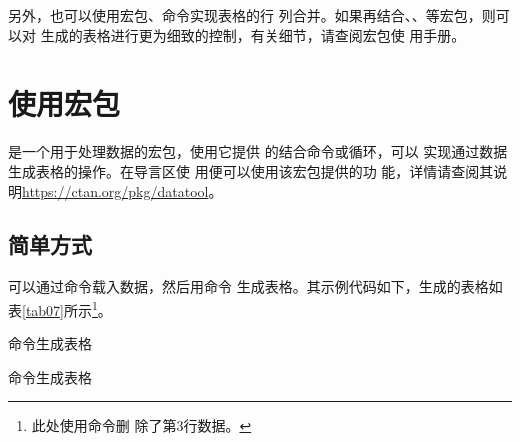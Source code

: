 \documentclass[scheme=chinese, heading = true, UTF8]{ctexart}
\begin{document}
  另外，也可以使用宏包、命令实现表格的行
  列合并。如果再结合、、等宏包，则可以对
  生成的表格进行更为细致的控制，有关细节，请查阅宏包使
  用手册。
        
  \section{使用宏包}
  是一个用于处理\csv 数据的宏包，使用它提供
  的结合命令或循环，可以
  实现通过数据生成表格的操作。在导言区使
  用\qtmark{\texinline{\usepackage{datatool}}}便可以使用该宏包提供的功
  能，详情请查阅其说明\url{https://ctan.org/pkg/datatool}。
  \subsection{简单方式}
  可以通过命令载入\csv 数据，然后用命令
  生成表格。其示例代码如下，生成的表格如
  表\ref{tab07}所示\footnote{此处使用命令删
    除了第3行数据。}。

  \begin{center}
    \begin{minipage}[h]{0.9\linewidth}
      \begin{codeonly}
        \begin{table}[htb]
          \centering    
          \caption{命令生成表格\label{tab07}}          
      \end{table}
      \end{codeonly}
    \end{minipage}
  \end{center}

  \begin{table}[htb]
    \centering
    \caption{命令生成表格\label{tab07}}
  \end{table}
\end{document}
